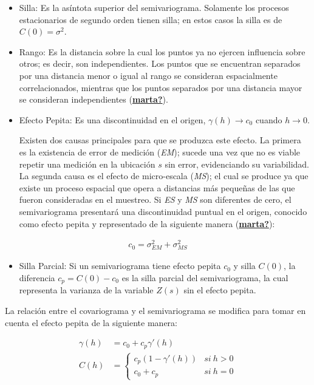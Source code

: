 \documentclass[
]{book}
\providecommand{\tightlist}{%
  \setlength{\itemsep}{0pt}\setlength{\parskip}{0pt}}
\begin{document}
\begin{itemize}
\item
  Silla: Es la asíntota superior del semivariograma. Solamente los procesos estacionarios de segundo orden tienen silla; en estos casos la silla es de \(C(0)=\sigma^2\).
\item
  Rango: Es la distancia sobre la cual los puntos ya no ejercen influencia sobre otros; es decir, son independientes. Los puntos que se encuentran separados por una distancia menor o igual al rango se consideran espacialmente correlacionados, mientras que los puntos separados por una distancia mayor se consideran independientes (\protect\hyperlink{ref-marta}{\textbf{marta?}}).
\item
  Efecto Pepita: Es una discontinuidad en el origen, \(\gamma(h)\to c_0\) cuando \(h\to 0\).

  Existen dos causas principales para que se produzca este efecto. La primera es la existencia de error de medición (\emph{EM}); sucede una vez que no es viable repetir una medición en la ubicación \(s\) sin error, evidenciando su variabilidad. La segunda causa es el efecto de micro-escala (\emph{MS}); el cual se produce ya que existe un proceso espacial que opera a distancias más pequeñas de las que fueron consideradas en el muestreo. Si \emph{ES} y \emph{MS} son diferentes de cero, el semivariograma presentará una discontinuidad puntual en el origen, conocido como efecto pepita y representado de la siguiente manera (\protect\hyperlink{ref-marta}{\textbf{marta?}}):
\end{itemize}

\begin{align}
        c_0=\sigma^2_{EM}+\sigma_{MS}^2  
  \end{align}

\begin{itemize}
\tightlist
\item
  Silla Parcial: Si un semivariograma tiene efecto pepita \(c_0\) y silla \(C(0)\), la diferencia \(c_p=C(0)-c_0\) es la silla parcial del semivariograma, la cual representa la varianza de la variable \(Z(s)\) sin el efecto pepita.
\end{itemize}

La relación entre el covariograma y el semivariograma se modifica para tomar en cuenta el efecto pepita de la siguiente manera:

\begin{align}
    \gamma(h) &= c_0+c_{p}\gamma'(h)\\
    C(h) &= \left \{ \begin{matrix} c_p(1-\gamma'(h)) & si \ h>0\\ 
    c_0+c_p & si \ h=0 \end{matrix}\right. 
\end{align}
\end{document}
